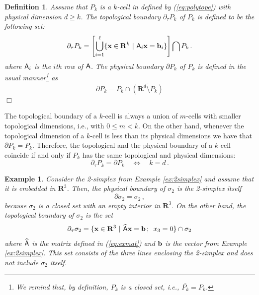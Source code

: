 \documentclass[pdf,12pt,relaxed]{SANDreport}
\newtheorem{defin}{Definition}
\newtheorem{exam}{Example}
\begin{document}
    
        
    
    \begin{defin}\label{def:bdry}
    Assume that $P_k$ is a $k$-cell in defined by (\ref{eq:polytope}) with physical dimension $d\ge k$. 
    The topological boundary $\partial_\tau {P_k}$ of $P_k$ is defined to be the following set:
    \begin{equation}\label{eq:bdry}
    \partial_\tau{P_k} = 
    \left[ \bigcup_{i=1}^{\ell}
    \{ {\bf x}\in{\mathbf R}^k\,\,|\,\, {\sf A}_i {\bf x} = {\bf b}_i \} \right]\bigcap {P_k} \,.
    \end{equation}
    where ${\sf A}_i$ is the $i$th row of ${\sf A}$.
    The physical boundary $\partial {P_k}$ of $P_k$ is defined in the usual manner\footnote{We remind that, by definition, $P_k$ is a closed set, i.e., $\overline{P_k} = P_k$.} as
    \begin{equation}\label{eq:phys-bdry}
    \partial{P_k} = P_k \cap\overline{(\mathbf{R}^d\setminus P_k)}
    \end{equation}
    \hfill$\Box$
    \end{defin}
    
    The topological boundary of a $k$-cell is always a union of $m$-cells with smaller topological dimensions, i.e., with 
    $0\le m < k$. On the other hand, whenever the topological dimension of a $k$-cell is less than its physical dimensions we have that $\partial{P_k} = P_k$. Therefore, the topological and the physical boundary of a $k$-cell coincide if and only if $P_k$ has the same topological and physical dimensions:
    $$
    \partial_\tau P_k = \partial P_k \quad \Leftrightarrow \quad k=d \,.
    $$
    
    \begin{exam}\label{ex:bdry-compare}
    \emph{
    Consider the 2-simplex from Example \ref{ex:2simplex} and assume that it is embedded in $\mathbf{R}^3$. Then, the physical boundary of $\sigma_2$ is the 2-simplex itself 
    $$
    \partial\sigma_2 = \sigma_2 \,,
    $$
    because $\sigma_2$ is a closed set with an empty interior in $\mathbf{R}^3$. On the other hand, the 
    topological boundary of $\sigma_2$ is the set
    $$
    \partial_\tau \sigma_2 = \{ {\bf x} \in {\bf R}^3\,\,|\,\, \widehat{\sf A} {\bf x} = {\bf b}\,;\,\,\, x_3 = 0 \}\cap \sigma_2
    $$
    where $\widehat{\sf A}$ is the matrix defined in (\ref{eq:exmat}) and ${\bf b}$ is the vector from Example \ref{ex:2simplex}.
    This set consists of the three lines enclosing the 2-simplex and does not include $\sigma_2$ itself.
    }
    \end{exam}
    
\end{document}
